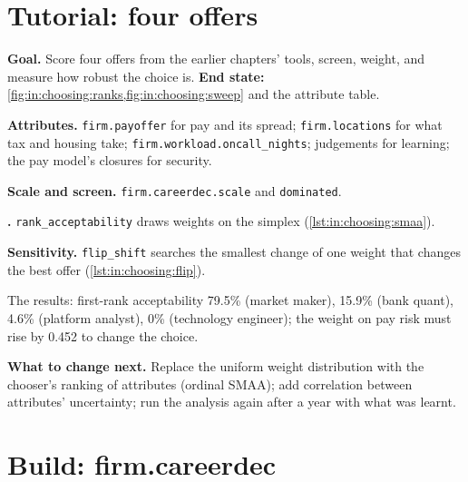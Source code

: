\section{Tutorial: four offers}\label{tut:in:choosing:tut}

\begin{tutorial}
\textbf{Goal.} Score four offers from the earlier chapters' tools, screen, weight, and measure how robust the choice is.
\textbf{End state:} \cref{fig:in:choosing:ranks,fig:in:choosing:sweep} and the attribute table.
\begin{tutsteps}
\item \textbf{Attributes.} \texttt{firm.payoffer} for pay and its spread; \texttt{firm.locations} for what tax and
housing take; \texttt{firm.workload.oncall\_nights}; judgements for learning; the pay model's closures for security.
\item \textbf{Scale and screen.} \texttt{firm.careerdec.scale} and \texttt{dominated}.
\item \textbf{.} \texttt{rank\_acceptability} draws weights on the simplex
(\cref{lst:in:choosing:smaa}).
\label{lst:in:choosing:smaa}
\item \textbf{Sensitivity.} \texttt{flip\_shift} searches the smallest change of one weight that changes the best offer
(\cref{lst:in:choosing:flip}).
\label{lst:in:choosing:flip}
\end{tutsteps}
\end{tutorial}

The results: first-rank acceptability 79.5\% (market maker), 15.9\% (bank quant), 4.6\% (platform analyst), 0\%
(technology engineer); the weight on pay risk must rise by 0.452 to change the choice.

\textbf{What to change next.} Replace the uniform weight distribution with the chooser's ranking of attributes (ordinal
SMAA); add correlation between attributes' uncertainty; run the analysis again after a year with what was learnt.

\section{Build: firm.careerdec}\label{bld:in:choosing:careerdec}

